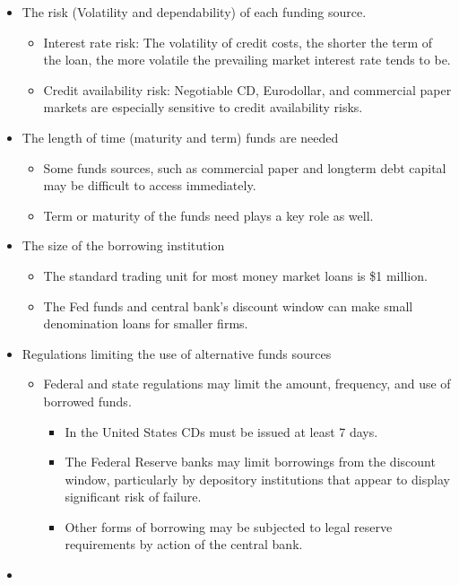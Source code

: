 \begin{itemize}
\item The risk (Volatility and dependability) of each funding source.
    \begin{itemize}
    \item Interest rate risk: The volatility of credit costs, the shorter the term of the loan, the more volatile the prevailing market interest rate tends to be.
    \item Credit availability risk: Negotiable CD, Eurodollar, and commercial paper markets are especially sensitive to credit availability risks.
    \end{itemize}
\item The length of time (maturity and term) funds are needed
    \begin{itemize}
    \item Some funds sources, such as commercial paper and longterm debt capital may be difficult to access immediately.
    \item Term or maturity of the funds need plays a key role as well.
    \end{itemize}
\item The size of the borrowing institution
    \begin{itemize}
    \item The standard trading unit for most money market loans is \$1 million.
    \item The Fed funds and central bank's discount window can make small denomination loans for smaller firms.
    \end{itemize}
\item Regulations limiting the use of alternative funds sources
    \begin{itemize}
    \item Federal and state regulations may limit the amount, frequency, and use of borrowed funds.
        \begin{itemize}
        \item In the United States CDs must be issued at least 7 days.
        \item The Federal Reserve banks may limit borrowings from the discount window, particularly by depository institutions that appear to display significant risk of failure.
        \item Other forms of borrowing may be subjected to legal reserve requirements by action of the central bank.
        \end{itemize}
        
    \end{itemize}
\item 


\end{itemize}



